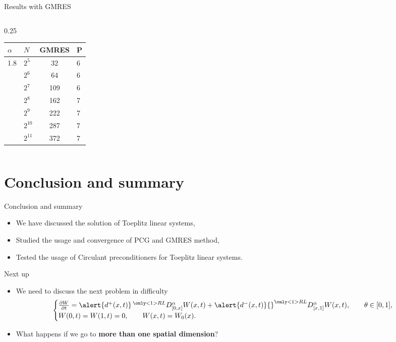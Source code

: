 \documentclass[aspectratio=169,xcolor=dvipsnames]{beamer}
\begin{document}
\begin{frame}[fragile]{Results with GMRES}
{\begin{columns}
\begin{column}{0.25\columnwidth}
\begin{tabular}{llcl}
\toprule
$\alpha$ & $N$ & GMRES & P \\
\midrule
\multirow{7}{*}{1.8} & $2^{5}$ & 32 & 6 \\
& $2^{6}$ & 64 & 6 \\
& $2^{7}$ & 109 & 6 \\
& $2^{8}$ & 162 & 7 \\
& $2^{9}$ & 222 & 7 \\
& $2^{10}$ & 287 & 7 \\
& $2^{11}$ & 372 & 7 \\
\bottomrule
\end{tabular}
\end{column}

\end{columns}}

\end{frame}


\section{Conclusion and summary}

\begin{frame}{Conclusion and summary}
	
	\begin{itemize}
		\item[\textcolor{success}{\faCheckCircle}] We have discussed the solution of Toeplitz linear systems,
		\item[\textcolor{success}{\faCheckCircle}] Studied the usage and convergence of PCG and GMRES method,
		\item[\textcolor{success}{\faCheckCircle}] Tested the usage of Circulant preconditioners for Toeplitz linear systems.
	\end{itemize}

Next up
	\begin{itemize}
		\item[\textcolor{todo}{\faClipboardList}] We need to discuss the next problem in difficulty
		\begin{equation*}
			\begin{cases}\frac{\partial W}{\partial t} = \alert{d^+(x,t)} \,{}^{\only<1>{RL}}D_{[0,x]}^\alpha W(x,t) + \alert{d^-(x,t)} {}^{\only<1>{RL}}D_{[x,1]}^\alpha W(x,t), \qquad \theta \in [0,1],\\
				W(0,t) = W(1,t) = 0, \qquad W(x,t) = W_0(x).	
			\end{cases}
		\end{equation*}
		\item[\textcolor{todo}{\faClipboardList}] What happens if we go to \textbf{more than one spatial dimension}?
	\end{itemize}

\end{frame}
\end{document}
